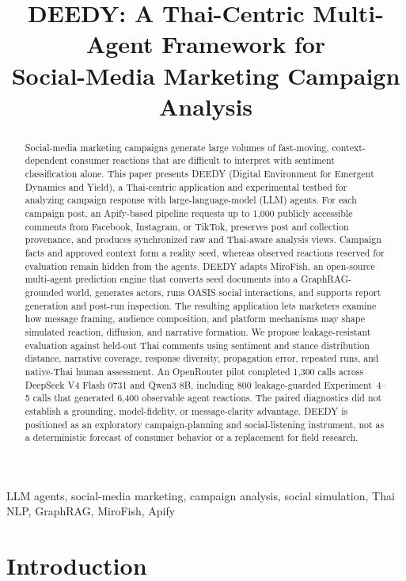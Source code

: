 \documentclass[conference]{IEEEtran}
\title{DEEDY: A Thai-Centric Multi-Agent Framework for\\
Social-Media Marketing Campaign Analysis}
\author{\IEEEauthorblockN{Sawit Koseeyaumporn}
\IEEEauthorblockA{Department of Computer Engineering\\
King Mongkut's University of Technology Thonburi, Bangkok, Thailand\\
\texttt{sawit.kosee@kmutt.ac.th}}}
\begin{document}
\maketitle

\begin{abstract}
Social-media marketing campaigns generate large volumes of fast-moving,
context-dependent consumer reactions that are difficult to interpret with
sentiment classification alone. This paper presents DEEDY (Digital Environment
for Emergent Dynamics and Yield), a Thai-centric application and experimental
testbed for analyzing campaign response with large-language-model (LLM)
agents. For each campaign post, an Apify-based pipeline requests up to 1,000
publicly accessible comments from Facebook, Instagram, or TikTok, preserves
post and collection provenance, and produces synchronized raw and Thai-aware
analysis views. Campaign facts and approved context form a reality seed,
whereas observed reactions reserved for evaluation remain hidden from the
agents. DEEDY adapts MiroFish, an open-source multi-agent prediction engine
that converts seed documents into a GraphRAG-grounded world, generates actors,
runs OASIS social interactions, and supports report generation and post-run
inspection. The resulting application lets marketers examine how message
framing, audience composition, and platform mechanisms may shape simulated
reaction, diffusion, and narrative formation. We propose leakage-resistant
evaluation against held-out Thai comments using sentiment and stance
distribution distance, narrative coverage, response diversity, propagation
error, repeated runs, and native-Thai human assessment. An OpenRouter pilot
completed 1,300 calls across DeepSeek V4 Flash 0731 and Qwen3 8B, including
800 leakage-guarded Experiment~4--5 calls that generated 6,400 observable
agent reactions. The paired diagnostics did not establish a grounding,
model-fidelity, or message-clarity advantage.
DEEDY is positioned as
an exploratory campaign-planning and social-listening instrument, not as a
deterministic forecast of consumer behavior or a replacement for field
research.
\end{abstract}

\begin{IEEEkeywords}
LLM agents, social-media marketing, campaign analysis, social simulation, Thai
NLP, GraphRAG, MiroFish, Apify
\end{IEEEkeywords}

\section{Introduction}
\end{document}
